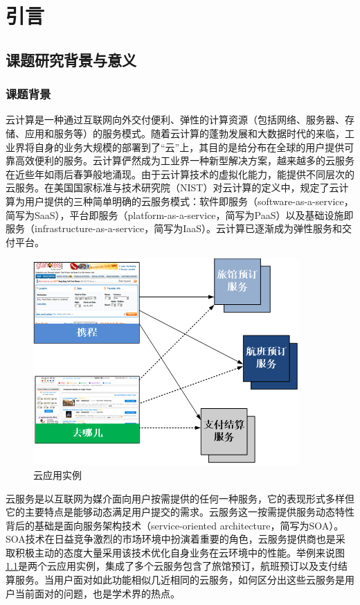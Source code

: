 \chapter{引言}
	\label{chapter_introduction}
	\section{课题研究背景与意义}
	\label{sec_background_meaning}
		\subsection{课题背景}
		\label{subsec_background}
		云计算是一种通过互联网向外交付便利、弹性的计算资源（包括网络、服务器、存储、应用和服务等）的服务模式。随着云计算的蓬勃发展和大数据时代的来临，工业界将自身的业务大规模的部署到了“云”上，其目的是给分布在全球的用户提供可靠高效便利的服务。云计算俨然成为工业界一种新型解决方案，越来越多的云服务在近些年如雨后春笋般地涌现。由于云计算技术的虚拟化能力，能提供不同层次的云服务。在美国国家标准与技术研究院（NIST）对云计算的定义中，规定了云计算为用户提供的三种简单明确的云服务模式：软件即服务（software-as-a-service，简写为SaaS），平台即服务（platform-as-a-service，简写为PaaS）以及基础设施即服务（infrastructure-as-a-service，简写为IaaS）。云计算已逐渐成为弹性服务和交付平台。
		\begin{figure}[htb]
			\centering
			\includegraphics[scale=1]{fig/introduction/cloud_application_instance.png}
			\caption{云应用实例}
			\label{fig_cloud_application_instance}
			\centering{}
		\end{figure}

		云服务是以互联网为媒介面向用户按需提供的任何一种服务，它的表现形式多样但它的主要特点是能够动态满足用户提交的需求。云服务这一按需提供服务动态特性背后的基础是面向服务架构技术（service-oriented architecture，简写为SOA）。SOA技术在日益竞争激烈的市场环境中扮演着重要的角色，云服务提供商也是采取积极主动的态度大量采用该技术优化自身业务在云环境中的性能。举例来说图\ref{fig_cloud_application_instance}是两个云应用实例，集成了多个云服务包含了旅馆预订，航班预订以及支付结算服务。当用户面对如此功能相似几近相同的云服务，如何区分出这些云服务是用户当前面对的问题，也是学术界的热点。

